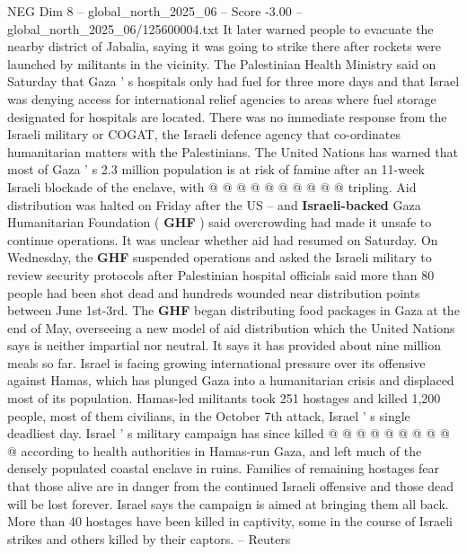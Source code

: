 \begin{textsample}{NEG Dim 8 – global\_north\_2025\_06 – Score -3.00 – global\_north\_2025\_06/125600004.txt}
It later warned people to evacuate the nearby district of Jabalia, saying it was going to strike there after rockets were launched by militants in the vicinity.
The Palestinian Health Ministry said on Saturday that Gaza ' s hospitals only had fuel for three more days and that Israel was denying access for international relief agencies to areas where fuel storage designated for hospitals are located.
There was no immediate response from the Israeli military or COGAT, the Israeli defence agency that co-ordinates humanitarian matters with the Palestinians.
The United Nations has warned that most of Gaza ' s 2.3 million population is at risk of famine after an 11-week Israeli blockade of the enclave, with @ @ @ @ @ @ @ @ @ @ tripling.
Aid distribution was halted on Friday after the US -- and \textbf{Israeli-backed} Gaza Humanitarian Foundation ( \textbf{GHF} ) said overcrowding had made it unsafe to continue operations.
It was unclear whether aid had resumed on Saturday.
On Wednesday, the \textbf{GHF} suspended operations and asked the Israeli military to review security protocols after Palestinian hospital officials said more than 80 people had been shot dead and hundreds wounded near distribution points between June 1st-3rd.
The \textbf{GHF} began distributing food packages in Gaza at the end of May, overseeing a new model of aid distribution which the United Nations says is neither impartial nor neutral.
It says it has provided about nine million meals so far.
Israel is facing growing international pressure over its offensive against Hamas, which has plunged Gaza into a humanitarian crisis and displaced most of its population.
Hamas-led militants took 251 hostages and killed 1,200 people, most of them civilians, in the October 7th attack, Israel ' s single deadliest day.
Israel ' s military campaign has since killed @ @ @ @ @ @ @ @ @ @ according to health authorities in Hamas-run Gaza, and left much of the densely populated coastal enclave in ruins.
Families of remaining hostages fear that those alive are in danger from the continued Israeli offensive and those dead will be lost forever.
Israel says the campaign is aimed at bringing them all back.
More than 40 hostages have been killed in captivity, some in the course of Israeli strikes and others killed by their captors. -- Reuters

\end{textsample}
